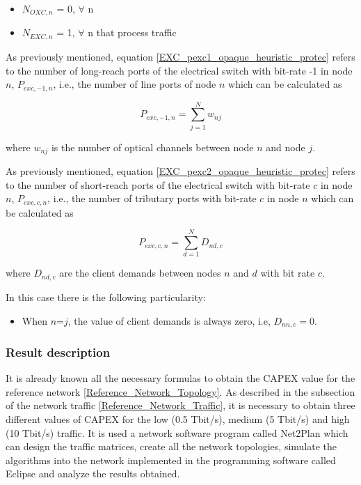 \begin{itemize}
  \item $N_{OXC,n}$ = 0, \quad $\forall$ n
  \item $N_{EXC,n}$ = 1, \quad $\forall$ n that process traffic
\end{itemize}

As previously mentioned, equation \ref{EXC_pexc1_opaque_heuristic_protec} refers to the number of long-reach ports of the electrical switch with bit-rate -1 in node $n$, $P_{exc,-1,n}$, i.e., the number of line ports of node $n$ which can be calculated as

\begin{equation}
P_{exc,-1,n} = \sum_{j=1}^{N} w_{nj}
\label{EXC_pexc1_opaque_heuristic_protec}
\end{equation}

\vspace{11pt}
where $w_{nj}$ is the number of optical channels between node $n$ and node $j$.

\newpage
\vspace{11pt}
As previously mentioned, equation \ref{EXC_pexc2_opaque_heuristic_protec} refers to the number of short-reach ports of the electrical switch with bit-rate $c$ in node $n$, $P_{exc,c,n}$, i.e., the number of tributary ports with bit-rate $c$ in node $n$ which can be calculated as

\begin{equation}
P_{exc,c,n} = \sum_{d=1}^{N} D_{nd,c}
\label{EXC_pexc2_opaque_heuristic_protec}
\end{equation}

\vspace{11pt}
where $D_{nd,c}$ are the client demands between nodes $n$ and $d$ with bit rate $c$.

\vspace{11pt}
In this case there is the following particularity:

\begin{itemize}
  \item When $n$=$j$, the value of client demands is always zero, i.e, $D_{nn,c}=0$.
\end{itemize}

\subsubsection{Result description}

It is already known all the necessary formulas to obtain the CAPEX value for the reference network \ref{Reference_Network_Topology}. As described in the subsection of the network traffic \ref{Reference_Network_Traffic}, it is necessary to obtain three different values of CAPEX for the low (0.5 Tbit/s), medium (5 Tbit/s) and high (10 Tbit/s) traffic. It is used a network software program called Net2Plan which can design the traffic matrices, create all the network topologies, simulate the algorithms into the network implemented in the programming software called Eclipse and analyze the results obtained.

